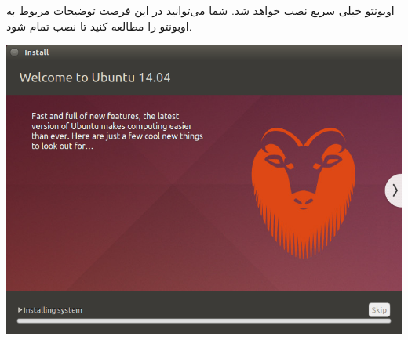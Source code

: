اوبونتو خیلی سریع نصب خواهد شد. شما می‌توانید در این فرصت توضیحات مربوط به 
اوبونتو را مطالعه کنید تا نصب تمام شود.
\begin{center}
\includegraphics[scale=0.52]{pics/12.png}
\end{center}
